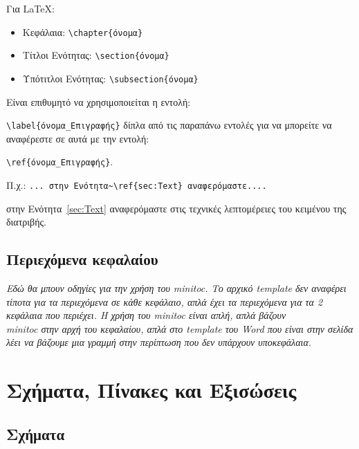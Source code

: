 \color{black}
\y Για \LaTeX:

\begin{itemize}
\item Κεφάλαια: \verb"\chapter{όνομα}"
\item Τίτλοι Ενότητας: \verb"\section{όνομα}"
\item Υπότιτλοι Ενότητας: \verb"\subsection{όνομα}"
\end{itemize}

\noindent Είναι επιθυμητό να χρησιμοποιείται η εντολή:

\chl \verb"\label{όνομα_Επιγραφής}" \s\s δίπλα από τις παραπάνω
εντολές για να μπορείτε να αναφέρεστε σε αυτά με την εντολή:

\chl \verb"\ref{όνομα_Επιγραφής}".

\chl Π.χ.: \verb"... στην Ενότητα~\ref{sec:Text} αναφερόμαστε...."

\chl στην Ενότητα~\ref{sec:Text} αναφερόμαστε στις τεχνικές
λεπτομέρειες του κειμένου της διατριβής.

\subsection{Περιεχόμενα κεφαλαίου}
\label{subsec:minitoc}

\textit{Εδώ θα μπουν οδηγίες για την χρήση του minitoc. Το αρχικό
template δεν αναφέρει τίποτα για τα περιεχόμενα σε κάθε κεφάλαιο,
απλά έχει τα περιεχόμενα για τα 2 κεφάλαια που περιέχει. Η χρήση
του minitoc είναι απλή, απλά βάζουν \\minitoc στην αρχή του κεφαλαίου,
απλά στο template του Word που είναι στην σελίδα λέει να βάζουμε μια
γραμμή στην περίπτωση που δεν υπάρχουν υποκεφάλαια.}


\section{Σχήματα, Πίνακες και Εξισώσεις}
\label{sec:Inclusion}

\subsection{Σχήματα}
\label{subsec:Figures}

